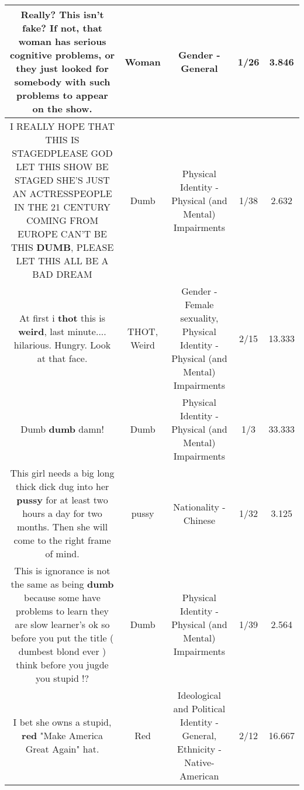 \documentclass[11pt]{article}
\newlength\mylength
\begin{document}
\begin{center}
\begin{longtable}{|C{.65\mylength}|C{.30\mylength}|C{.12\mylength}|C{.12\mylength}|C{.12\mylength}|}
  \small Really? This isn't fake? If not, that \textbf{woman} has serious cognitive problems, or they just looked for somebody with such problems to appear on the show.\normalsize   & Woman & Gender - General & 1/26 & 3.846 \\  \hline
  \small I REALLY HOPE THAT THIS IS STAGEDPLEASE GOD LET THIS SHOW BE STAGED SHE'S JUST AN ACTRESSPEOPLE IN THE 21 CENTURY COMING FROM EUROPE CAN'T BE THIS \textbf{DUMB}, PLEASE LET THIS ALL BE A BAD DREAM\normalsize   & Dumb & Physical Identity - Physical (and Mental) Impairments & 1/38 & 2.632 \\  \hline
  \small At first i \textbf{thot} this is \textbf{weird}, last minute.... hilarious. Hungry. Look at that face.\normalsize   & THOT, Weird & Gender - Female sexuality, Physical Identity - Physical (and Mental) Impairments & 2/15 & 13.333 \\  \hline
  \small Dumb \textbf{dumb} damn!\normalsize   & Dumb & Physical Identity - Physical (and Mental) Impairments & 1/3 & 33.333 \\  \hline
  \small This girl needs a big long thick dick dug into her \textbf{pussy} for at least two hours a day for two months. Then she will come to the right frame of mind.\normalsize   & pussy & Nationality - Chinese & 1/32 & 3.125 \\  \hline
  \small This is ignorance is not the same as being \textbf{dumb} because some have problems to learn they are slow learner's ok so before you put the title ( dumbest blond ever ) think before you jugde you stupid !?\normalsize   & Dumb & Physical Identity - Physical (and Mental) Impairments & 1/39 & 2.564 \\  \hline
  \small I bet she owns a stupid, \textbf{r\textbf{ed}} "Make America Great Again" hat.\normalsize   & Red &  Ideological and Political Identity - General, Ethnicity - Native-American & 2/12 & 16.667 \\  \hline

\end{longtable}
\end{center}
\end{document}
